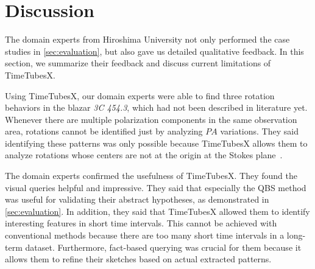 \section{Discussion}\label{sec:discussion}
The domain experts from Hiroshima University not only performed the case studies in \autoref{sec:evaluation}, but also gave us detailed qualitative feedback.
In this section, we summarize their feedback and discuss current limitations of TimeTubesX.

%
Using TimeTubesX, our domain experts were able to find three rotation behaviors in the blazar \emph{3C 454.3}, which had not been described in literature yet. 
Whenever there are multiple polarization components in the same observation area, rotations cannot be identified just by analyzing $PA$ variations.
They said identifying these patterns was only possible because TimeTubesX allows them to analyze rotations whose centers are not at the origin at the Stokes plane~\cite{Huang2019}. 

%
%
The domain experts confirmed the usefulness of TimeTubesX. 
They found the visual queries helpful and impressive. %
They said that especially the QBS method was useful for validating their abstract hypotheses, as demonstrated in \autoref{sec:evaluation}.
In addition, they said that TimeTubesX allowed them to identify interesting features in short time intervals.
This cannot be achieved with conventional methods because there are too many short time intervals in a long-term dataset.
Furthermore, fact-based querying was crucial for them because it allows them to refine their sketches based on actual extracted patterns. %

